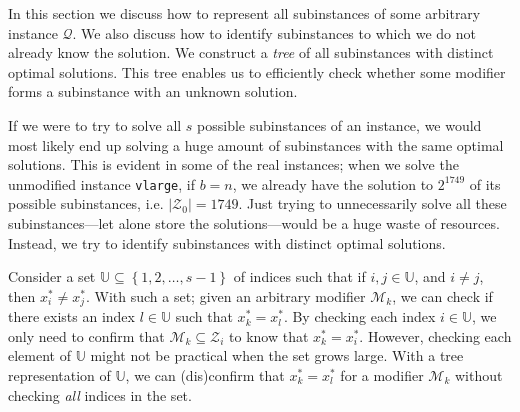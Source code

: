 In this section we discuss how to represent all subinstances of some arbitrary
instance $\mathcal{Q}$. We also discuss how to identify 
subinstances to which we do not already know the solution.
We construct a \emph{tree} of all subinstances with distinct optimal solutions.
This tree enables us to efficiently check whether some modifier forms a
subinstance with an unknown solution.

If we were to try to solve all $s$ possible subinstances of an
instance, we would most likely end up solving a huge amount of subinstances
with the same optimal solutions. This is evident in some of the real
instances; when we solve the unmodified instance \texttt{vlarge}, if $b = n$,
we already have the solution to $2^{1749}$ of its possible subinstances, i.e.
$|\mathcal{Z}_0| = 1749$.
Just trying to unnecessarily solve all these subinstances---let alone store the
solutions---would be a huge waste of resources.
Instead, we try to identify subinstances with distinct optimal solutions.
\begin{comment}
A good starting point is to find all the subsets of $\mathcal{N}_0$ and
use them as modifiers of $Q$. This is equivalent to forcing non-zero
variables in the optimal solution of the unchanged instance $Q$, to zero.
Recall from the previous section that if $\mathcal{Q}$ is known, knowing the
modifier $\mathcal{M}_k$ is sufficient to identify the subinstance
$\mathcal{Q}_k$.
While modifiers $\mathcal{M}_k$ such that
$\mathcal{M}_k \subseteq \mathcal{N}_0$ ensures that $x_k^*\neq x_0^*$,
it does not assure us that $x_k^* \neq x_l^*$ for all $l=1,2,\ldots,s-1$.
To make sure that we only solve subinstances with distinct optimal solutions,
we need to identify modifiers $\mathcal{M}_k$ such that
$\mathcal{M}_k \not \subset \mathcal{Z}_l$
for \emph{all} $l=1,2,\ldots,s-1$.
\end{comment}

Consider a set $\mathbb{U}\subseteq \left\{{1,2,\ldots,s-1}\right\}$ of indices
such that if $i,j \in \mathbb{U}$, and $i \neq j$, then $x_i^* \neq x_j^*$.
With such a set; given an arbitrary modifier $\mathcal{M}_k$, we can check
if there exists an index $l \in \mathbb{U}$ such that $x_k^* = x_l^*$. By
checking each index $i \in \mathbb{U}$, we only need to confirm that
$\mathcal{M}_k \subseteq \mathcal{Z}_i$ to know that $x_k^* = x_i^*$. However,
checking each element of $\mathbb{U}$ might not be practical when the set
grows large. With a tree representation of $\mathbb{U}$, we can (dis)confirm
that $x_k^* = x_l^*$ for a modifier $\mathcal{M}_k$ without checking \emph{all}
indices in the set.

